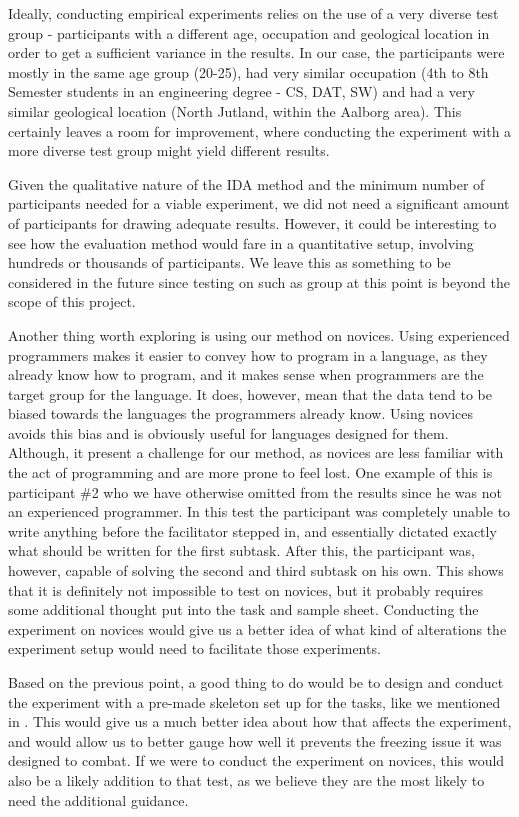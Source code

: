 Ideally, conducting empirical experiments relies on the use of a very diverse test group - participants with a different age, occupation and geological location in order to get a sufficient variance in the results. In our case, the participants were mostly in the same age group (20-25), had very similar occupation (4th to 8th Semester students in an engineering degree - CS, DAT, SW) and had a very similar geological location (North Jutland, within the Aalborg area). This certainly leaves a room for improvement, where conducting the experiment with a more diverse test group might yield different results.

Given the qualitative nature of the IDA method and the minimum number of participants needed for a viable experiment, we did not need a significant amount of participants for drawing adequate results. However, it could be interesting to see how the evaluation method would fare in a quantitative setup, involving hundreds or thousands of participants. We leave this as something to be considered in the future since testing on such as group at this point is beyond the scope of this project.

Another thing worth exploring is using our method on novices.
Using experienced programmers makes it easier to convey how to program in a language, as they already know how to program, and it  makes sense when programmers are the target group for the language.
It does, however, mean that the data tend to be biased towards the languages the programmers already know.
Using novices avoids this bias and is obviously useful for languages designed for them.
Although, it present a challenge for our method, as novices are less familiar with the act of programming and are more prone to feel lost.
One example of this is participant \#2 who we have otherwise omitted from the results since he was not an experienced programmer.
In this test the participant was completely unable to write anything before the facilitator stepped in, and essentially dictated exactly what should be written for the first subtask.
After this, the participant was, however, capable of solving the second and third subtask on his own.
This shows that it is definitely not impossible to test on novices, but it probably requires some additional thought put into the task and sample sheet.
Conducting the experiment on novices would give us a better idea of what kind of alterations the experiment setup would need to facilitate those experiments.

Based on the previous point, a good thing to do would be to design and conduct the experiment with a pre-made skeleton set up for the tasks, like we mentioned in .
This would give us a much better idea about how that affects the experiment, and would allow us to better gauge how well it prevents the freezing issue it was designed to combat.
If we were to conduct the experiment on novices, this would also be a likely addition to that test, as we believe they are the most likely to need the additional guidance. 

